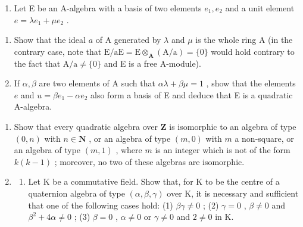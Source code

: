 \BourbakiExercisesSection

\begin{enumerate}
\def\labelenumi{\arabic{enumi}.}
\tightlist
\item
  Let E be an A-algebra with a basis of two elements \(e_1, e_2\) and a unit element \(e = \lambda e_1 + \mu e_2\) .
\end{enumerate}

\begin{enumerate}
\def\labelenumi{(\alph{enumi})}
\item
  Show that the ideal \(a\) of A generated by \(\lambda\) and \(\mu\) is the whole ring A (in the contrary case, note that \(\mathrm{E} / \mathrm{aE} = \mathrm{E} \otimes_{\mathbf{A}} (\mathrm{A} / \mathrm{a}) = \{0\}\) would hold contrary to the fact that \(\mathrm{A} / \mathrm{a} \neq \{0\}\) and E is a free A-module).
\item
  If \(\alpha, \beta\) are two elements of A such that \(\alpha\lambda + \beta\mu = 1\) , show that the elements \(e\) and \(u = \beta e_1 - \alpha e_2\) also form a basis of E and deduce that E is a quadratic A-algebra.
\end{enumerate}

\begin{enumerate}
\def\labelenumi{\arabic{enumi}.}
\setcounter{enumi}{1}
\item
  Show that every quadratic algebra over \(\mathbf{Z}\) is isomorphic to an algebra of type \((0, n)\) with \(n \in \mathbf{N}\) , or an algebra of type \((m, 0)\) with \(m\) a non-square, or an algebra of type \((m, 1)\) , where \(m\) is an integer which is not of the form \(k(k - 1)\) ; moreover, no two of these algebras are isomorphic.
\item
  \begin{enumerate}
  \def\labelenumii{(\alph{enumii})}
  \tightlist
  \item
    Let K be a commutative field. Show that, for K to be the centre of a quaternion algebra of type \((\alpha, \beta, \gamma)\) over K, it is necessary and sufficient that one of the following cases hold: (1) \(\beta\gamma \neq 0\) ; (2) \(\gamma = 0\) , \(\beta \neq 0\) and \(\beta^{2} + 4\alpha \neq 0\) ; (3) \(\beta = 0\) , \(\alpha \neq 0\) or \(\gamma \neq 0\) and \(2 \neq 0\) in K.
  \end{enumerate}
\end{enumerate}

